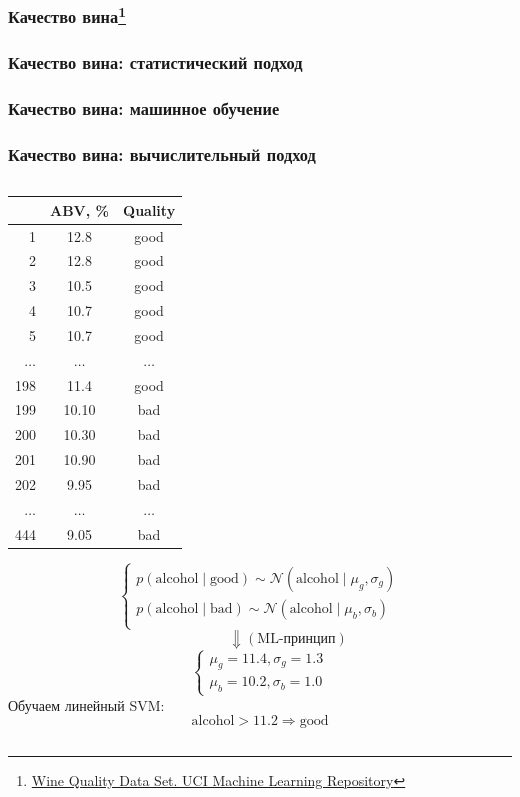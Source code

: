 \documentclass[aspectratio=169]{beamer}
\begin{document}
\begin{frame}
\frametitle<1>{Качество вина\footnote{\href{https://archive.ics.uci.edu/ml/datasets/Wine+Quality}{Wine Quality Data Set. UCI Machine Learning Repository}}}
\frametitle<2>{Качество вина: статистический подход}
\frametitle<3>{Качество вина: машинное обучение}
\frametitle<4>{Качество вина: вычислительный подход}

\begin{columns}[c]
    \begin{column}{.49\linewidth}
    \begin{footnotesize}
    \begin{overprint}
				\begin{center}
			\begin{tabular}{r  c  c}
			& ABV, \% & Quality \\
			\hline
			1 & 12.8 & good \\
			2 & 12.8 & good \\
			3 & 10.5 & good \\
			4 & 10.7 & good \\
			5 & 10.7 & good \\
			$\ldots$ & $\ldots$ & $\ldots$ \\
			198 & 11.4 & good \\
			199 & 10.10 & bad \\
			200 & 10.30 & bad \\
			201 & 10.90 & bad \\
			202 & 9.95 & bad \\
			$\ldots$ & $\ldots$ & $\ldots$ \\
			444 & 9.05 & bad \\
			\end{tabular}
			\end{center}
			  \[
			\begin{cases}
			p( \text{alcohol} \mid \text{good} ) \sim \mathcal{N}(\text{alcohol} \mid \mu_g, \sigma_g) \\
			p( \text{alcohol} \mid \text{bad} ) \sim \mathcal{N}(\text{alcohol} \mid \mu_b, \sigma_b) \\
			\end{cases}
			\]
			\[
			\qquad\qquad\Downarrow (\text{ML-принцип})
			\]
			\[
			\begin{cases}
			\mu_g=11.4, \sigma_g=1.3 \\
			\mu_b=10.2, \sigma_b=1.0
			\end{cases}
			\]
			  \onslide<3>
			  Обучаем линейный SVM:
			  \[\text{alcohol} > 11.2 \Rightarrow \text{good}\]

\end{overprint}
\end{footnotesize}
\end{column}
\end{columns}
\end{frame}
\end{document}
